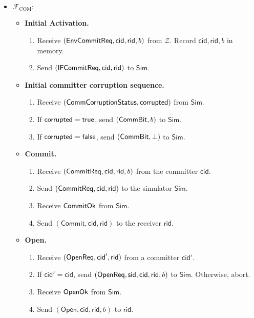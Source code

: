 \documentclass[11pt,letterpaper]{article}
\theoremstyle{plain} %
\theoremstyle{definition} %
\theoremstyle{remark} %
\newcommand{\OpenMsg}{\mathsf{Open}}
\newcommand{\CommitMsg}{\mathsf{Commit}}
\newcommand{\Simulator}{{\mathsf{Sim}}} %
\newcommand{\Environment}{{\mathcal{Z}}} %
\newcommand{\IF}{\mathcal{F}} %
\newcommand{\sid}{\mathsf{sid}}
\newcommand{\CommitterId}{\mathsf{cid}}
\newcommand{\ReceiverId}{\mathsf{rid}}
\newcommand{\True}{\mathsf{true}}
\newcommand{\False}{\mathsf{false}}
\newcommand{\IFCom}{\IF_{\mathrm{COM}}}
\newcommand{\CommBit}{b}
\begin{document}
\begin{mdframed}
\begin{itemize}
\item[]$\IFCom:$
\begin{itemize}
\item \textbf{Initial Activation.}
\begin{enumerate}[nolistsep]
\item Receive $(\EnvCommitReqMsg, \CommitterId, \ReceiverId, \CommBit)$ from $\Environment$. Record $\CommitterId, \ReceiverId, \CommBit$ in memory.
\item Send $(\IFCommitReqMsg, \CommitterId,\ReceiverId)$ to $\Simulator$.
\end{enumerate}

\item \textbf{Initial committer corruption sequence.}
\begin{enumerate}[nolistsep]
\item Receive $(\mathsf{CommCorruptionStatus}, \mathsf{corrupted})$ from $\Simulator$.
\item If $\CommCorruptedBit = \True$, send $(\CommBitMsg, \CommBit)$ to $\Simulator$.
\item If $\CommCorruptedBit = \False$, send $(\mathsf{CommBit}, \bot)$ to $\Simulator$.
\end{enumerate}

\item \textbf{Commit.}
\begin{enumerate}[nolistsep]
\item Receive $(\CommitReq, \CommitterId, \ReceiverId, \CommBit)$ from the committer $\CommitterId$.
\item Send $(\CommitReq, \CommitterId, \ReceiverId)$ to the simulator $\Simulator$.
\item Receive $\mathsf{CommitOk}$ from $\Simulator$.
\item Send $(\CommitMsg, \CommitterId, \ReceiverId)$ to the receiver $\ReceiverId$.
\end{enumerate}

\item \textbf{Open.}
\begin{enumerate}[nolistsep]
\item Receive $(\OpenReq, \CommitterId', \ReceiverId)$ from a committer $\CommitterId'$.
\item If $\CommitterId' = \CommitterId$, send $(\OpenReq, \sid, \CommitterId, \ReceiverId, \CommBit)$ to $\Simulator$. Otherwise, abort.
\item Receive $\mathsf{OpenOk}$ from $\Simulator$.
\item Send $(\OpenMsg, \CommitterId, \ReceiverId, \CommBit)$ to $\ReceiverId$.
\end{enumerate}


\end{itemize}
\end{itemize}
\end{mdframed}
\end{document}

